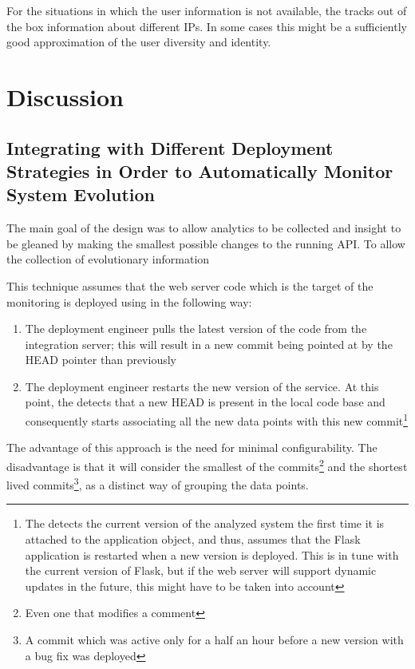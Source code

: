 \documentclass[conference]{IEEEtran}
\begin{document}
  For the situations in which the user information is not available, the \tool tracks out of the box information about different IPs. In some cases this might be a sufficiently good approximation of the user diversity and identity.

\section{Discussion}

  \subsection{Integrating with Different Deployment Strategies in Order to Automatically Monitor System Evolution}

  The main goal of the \tool design was to allow analytics to be collected and insight to be gleaned by making the smallest possible changes to the running API. To allow the collection of evolutionary information 

  This technique assumes that the web server code which is the target of the monitoring is deployed using \git in the following way: 

  \begin{enumerate}
    \item The deployment engineer pulls the latest version of the code from the integration server; this will result in a new commit being pointed at by the HEAD pointer than previously
    \item The deployment engineer restarts the new version of the service. At this point, the \tool detects that a new HEAD is present in the local code base and consequently starts associating all the new data points with this new commit\footnote{The \tool detects the current version of the analyzed system the first time it is attached to the application object, and thus, assumes that the Flask application is restarted when a new version is deployed. This is in tune with the current version of Flask, but if the web server will support dynamic updates in the future, this might have to be taken into account}
  \end{enumerate}

  The advantage of this approach is the need for minimal configurability. The disadvantage is that it will consider the smallest of the commits\footnote{Even one that modifies a comment} and the shortest lived commits\footnote{A commit which was active only for a half an hour before a new version with a bug fix was deployed}, as a distinct way of grouping the data points. 
\end{document}
